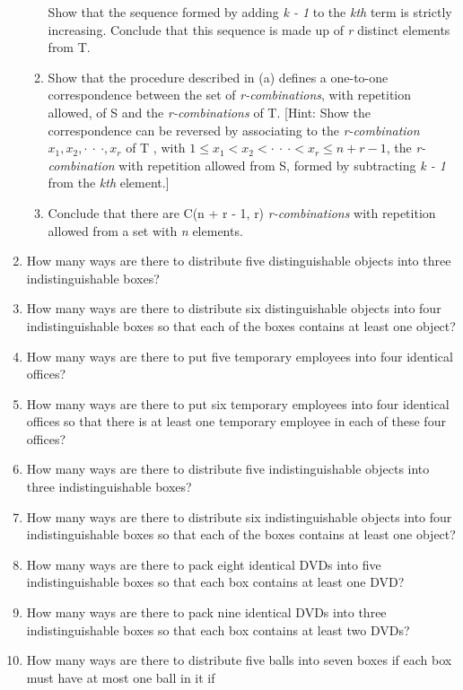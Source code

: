 \documentclass[11pt,a4paper]{book}
\begin{document}
\begin{enumerate}
\begin{enumerate}[label=\alph*)]
Show that the sequence formed by adding \emph{k - 1} to the \emph{kth} term is strictly increasing.
Conclude that this sequence is made up of \emph{r} distinct elements from T.
\item Show that the procedure described in (a) defines a one-to-one correspondence between the set of \emph{r-combinations}, with repetition allowed, of S and the \emph{r-combinations} of T. [Hint: Show the correspondence can be reversed by associating to the \emph{r-combination} ${x_1, x_2, \cdot~\cdot~\cdot , x_r }$ of T , with $1 \leq x_1 <
x_2 < \cdot~\cdot~\cdot < x_r \leq n + r - 1$, the \emph{r-combination} with repetition allowed from S, formed by subtracting \emph{k - 1} from the \emph{kth} element.]
\item Conclude that there are C(n + r - 1, r) \emph{r-combinations} with repetition allowed from a set with \emph{n} elements.
\end{enumerate}
\item How many ways are there to distribute five distinguishable objects into three indistinguishable boxes?
\item How many ways are there to distribute six distinguishable objects into four indistinguishable boxes so that each of the boxes contains at least one object?
\item How many ways are there to put five temporary employees into four identical offices?
\item How many ways are there to put six temporary employees into four identical offices so that there is at least one temporary employee in each of these four offices?
\item How many ways are there to distribute five indistinguishable objects into three indistinguishable boxes?
\item How many ways are there to distribute six indistinguishable objects into four indistinguishable boxes so that each of the boxes contains at least one object?
\item How many ways are there to pack eight identical DVDs into five indistinguishable boxes so that each box contains at least one DVD?
\item How many ways are there to pack nine identical DVDs into three indistinguishable boxes so that each box contains at least two DVDs?
\item How many ways are there to distribute five balls into seven boxes if each box must have at most one ball in it if

\end{enumerate}
\end{document}
